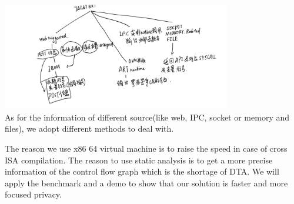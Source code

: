 \documentclass[
    ngerman,american
    ]{scrartcl}
\newcommand{\lang}{en}
\begin{document}
\begin{description}[style=unboxed]
                \includegraphics[width=10cm]{2.png}\\
                As for the information of different source(like web, IPC, socket or memory and files), we adopt different methods to deal with.

            \item [\questionFour{\lang}]
                The reason we use x86 64 virtual machine is to raise the speed in case of cross ISA compilation. The reason to use static analysis is to get a more precise information of the control flow graph which is the shortage of DTA.
                We will apply the benchmark and a demo to show that our solution is faster and more focused privacy.
        \end{description}
        
\end{document}
